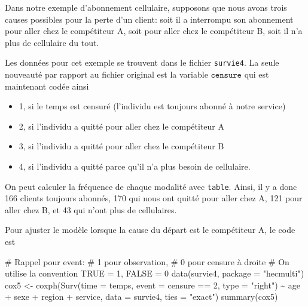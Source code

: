 \documentclass[
  11pt,
  letterpaper,
]{book}
\newenvironment{Shaded}{\begin{snugshade}}{\end{snugshade}}
\newcommand{\AttributeTok}[1]{\textcolor[rgb]{0.40,0.45,0.13}{#1}}
\newcommand{\CommentTok}[1]{\textcolor[rgb]{0.37,0.37,0.37}{#1}}
\newcommand{\DecValTok}[1]{\textcolor[rgb]{0.68,0.00,0.00}{#1}}
\newcommand{\FunctionTok}[1]{\textcolor[rgb]{0.28,0.35,0.67}{#1}}
\newcommand{\NormalTok}[1]{\textcolor[rgb]{0.00,0.23,0.31}{#1}}
\newcommand{\OtherTok}[1]{\textcolor[rgb]{0.00,0.23,0.31}{#1}}
\newcommand{\SpecialCharTok}[1]{\textcolor[rgb]{0.37,0.37,0.37}{#1}}
\newcommand{\StringTok}[1]{\textcolor[rgb]{0.13,0.47,0.30}{#1}}
\providecommand{\tightlist}{%
  \setlength{\itemsep}{0pt}\setlength{\parskip}{0pt}}\usepackage{longtable,booktabs,array}
\theoremstyle{definition}
\theoremstyle{remark}
\begin{document}
Dans notre exemple d'abonnement cellulaire, supposons que nous avons
trois causes possibles pour la perte d'un client: soit il a interrompu
son abonnement pour aller chez le compétiteur A, soit pour aller chez le
compétiteur B, soit il n'a plus de cellulaire du tout.

Les données pour cet exemple se trouvent dans le fichier
\texttt{survie4}. La seule nouveauté par rapport au fichier original est
la variable \(\texttt{censure}\) qui est maintenant codée ainsi

\begin{itemize}
\tightlist
\item
  1, si le temps est censuré (l'individu est toujours abonné à notre
  service)
\item
  2, si l'individu a quitté pour aller chez le compétiteur A
\item
  3, si l'individu a quitté pour aller chez le compétiteur B
\item
  4, si l'individu a quitté parce qu'il n'a plus besoin de cellulaire.
\end{itemize}

On peut calculer la fréquence de chaque modalité avec \texttt{table}.
Ainsi, il y a donc 166 clients toujours abonnés, 170 qui nous ont quitté
pour aller chez A, 121 pour aller chez B, et 43 qui n'ont plus de
cellulaires.

Pour ajuster le modèle lorsque la cause du départ est le compétiteur A,
le code est

\begin{Shaded}
\begin{Highlighting}[]
\CommentTok{\# Rappel pour \textasciigrave{}event\textasciigrave{}:}
\CommentTok{\#   1 pour observation, }
\CommentTok{\#   0 pour censure à droite}
\CommentTok{\# On utilise la convention TRUE = 1, FALSE = 0}
\FunctionTok{data}\NormalTok{(survie4, }\AttributeTok{package =} \StringTok{"hecmulti"}\NormalTok{)}
\NormalTok{cox5 }\OtherTok{\textless{}{-}} \FunctionTok{coxph}\NormalTok{(}\FunctionTok{Surv}\NormalTok{(}\AttributeTok{time =}\NormalTok{ temps, }
                   \AttributeTok{event =}\NormalTok{ censure }\SpecialCharTok{==} \DecValTok{2}\NormalTok{,}
                   \AttributeTok{type =} \StringTok{"right"}\NormalTok{) }\SpecialCharTok{\textasciitilde{}} 
\NormalTok{                age }\SpecialCharTok{+}\NormalTok{ sexe }\SpecialCharTok{+}\NormalTok{ region }\SpecialCharTok{+}\NormalTok{ service, }
              \AttributeTok{data =}\NormalTok{ survie4,}
              \AttributeTok{ties =} \StringTok{"exact"}\NormalTok{)}
\FunctionTok{summary}\NormalTok{(cox5)}
\end{Highlighting}
\end{Shaded}
\end{document}
